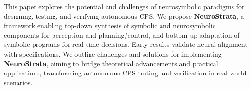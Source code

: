 This paper explores the potential and challenges of neurosymbolic paradigms for designing, testing, and verifying autonomous CPS. We propose \textbf{NeuroStrata}, a framework enabling top-down synthesis of symbolic and neurosymbolic components for perception and planning/control, and bottom-up adaptation of symbolic programs for real-time decisions. Early results validate neural alignment with specifications. We outline challenges and solutions for implementing \textbf{NeuroStrata}, aiming to bridge theoretical advancements and practical applications, transforming autonomous CPS testing and verification in real-world scenarios.


